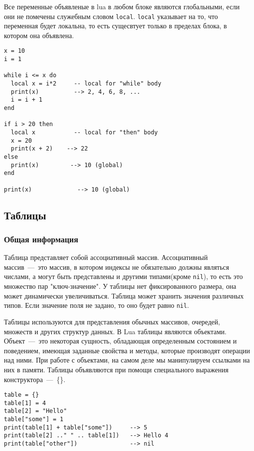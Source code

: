 Все переменные объявленые в lua в любом блоке являются глобальными, если они не помечены служебным словом \lstinline{local}.
\lstinline{local} указывает на то, что переменная будет локальна, то есть сущесвтует только в пределах блока, в котором она объявлена. 

\begin{lstlisting}
x = 10
i = 1  
    
while i <= x do
  local x = i*2     -- local for "while" body
  print(x)          --> 2, 4, 6, 8, ...
  i = i + 1
end
  
if i > 20 then
  local x           -- local for "then" body
  x = 20
  print(x + 2)	  --> 22
else
  print(x)         --> 10 (global)
end
    
print(x)             --> 10 (global)
\end{lstlisting}

\subsection{Таблицы}
\label{subsec:tables}

\subsubsection{Общая информация}

Таблица представляет собой ассоциативный массив. Ассоциативный массив~---~это массив, в котором индексы не обязательно должны являться числами, а могут быть представлены и другими типами(кроме \lstinline{nil}), то есть это множество пар "ключ-значение". У таблицы нет фиксированного размера, она может динамически увеличиваться. Таблица может хранить значения различных типов. Если значение поля не задано, то оно будет равно \lstinline{nil}. 

Таблицы используются для представления обычных массивов, очередей, множеств и других структур данных. В Lua таблицы являются объектами. Объект~---~это некоторая сущность, обладающая определенным состоянием и поведением, имеющая заданные свойства и методы, которые производят операции над ними. При работе с объектами, на самом деле мы манипулируем ссылками на них в памяти. Таблицы объявляются при помощи специального выражения  конструктора~---~\{\}. 

\begin{lstlisting}
table = {}
table[1] = 4
table[2] = "Hello"
table["some"] = 1
print(table[1] + table["some"])     --> 5
print(table[2] .." " .. table[1])   --> Hello 4
print(table["other"])               --> nil
\end{lstlisting}

